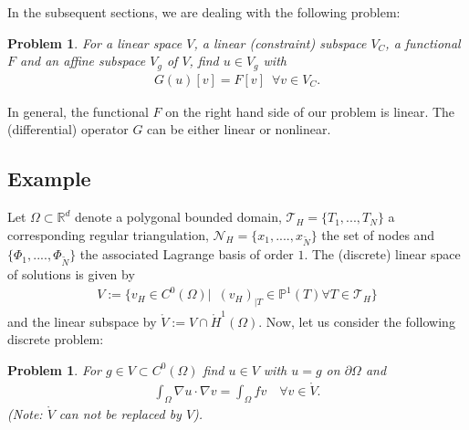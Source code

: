 \documentclass[a4paper,11pt]{article}
\numberwithin{equation}{section}
\newtheorem{problem}[definition]{Problem}
\begin{document}
  In the subsequent sections, we are dealing with the following problem:

  \begin{problem}
  For a linear space $V$, a linear (constraint) subspace $V_C$, a functional $F$ and an affine subspace $V_g$ of $V$, find $u \in V_g$ with
  \begin{align*}
  G(u)[v] = F[v] \enspace \forall v \in V_C.
  \end{align*}
  \end{problem}
  In general, the functional $F$ on the right hand side of our problem is linear. The (differential) operator $G$ can be either linear or nonlinear.

  \subsection{Example}

  Let $\Omega \subset \mathbb{R}^d$ denote a polygonal bounded domain, $\mathcal{T}_H = \{ T_1, ..., T_N \}$ a corresponding regular triangulation, $\mathcal{N}_H = \{ x_1, ...., x_{\tilde{N}}\}$ the set of nodes and $\{ \Phi_1, ...., \Phi_{\tilde{N}}\}$ the associated Lagrange basis of order $1$. The (discrete) linear space of solutions is given by
  \begin{align*}
  V := \{ v_H \in C^0(\Omega)| \enspace (v_H)_{|T}\in \mathbb{P}^1(T) \forall T \in \mathcal{T}_H \}
  \end{align*}
  and the linear subspace by $\mathring{V} := V \cap \mathring{H}^1(\Omega)$. Now, let us consider the following discrete problem:
  \begin{problem}
  For $g \in V \subset C^0(\Omega)$ find $u \in V$ with $u=g$ on $\partial \Omega$ and
  \begin{align*}
  \int_{\Omega} \nabla u \cdot \nabla v = \int_{\Omega} f v \quad \forall v \in \mathring{V}.
  \end{align*}
  (Note: $\mathring{V}$ can not be replaced by $V$).
  \end{problem}
\end{document}
